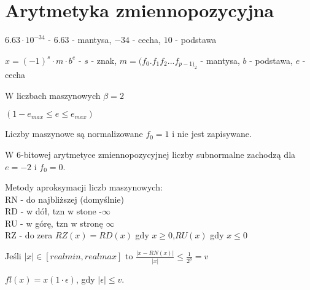 \section{Arytmetyka zmiennopozycyjna}

\entry
$6.63 \cdot 10^{-34}$ - $6.63$ - mantysa, $-34$ - cecha, $10$ - podstawa

\entry
$x = (-1)^s \cdot m \cdot b^e$ - $s$ - znak, $m = (f_0.f_1f_2...f_{p-1)_2}$ - mantysa, $b$ - podstawa, $e$ - cecha

\entry
W liczbach maszynowych $\beta = 2$

\entry
$(1 - e_{max} \leq e \leq e_{max})$

\entry
Liczby maszynowe są normalizowane $f_0 = 1$ i nie jest zapisywane.

\entry
W 6-bitowej arytmetyce zmiennopozycyjnej liczby subnormalne zachodzą dla $e=-2$ i $f_0 = 0$.

\entry
Metody aproksymacji liczb maszynowych:\\
RN - do najbliższej (domyślnie)\\
RD - w dół, tzn w stone -$\infty$\\
RU - w górę, tzn w stronę $\infty$\\
RZ - do zera $RZ(x) = RD(x)$ gdy $x \geq 0$,$RU(x)$ gdy $x \leq 0$

\entry
Jeśli $|x| \in [realmin, realmax]$ to $\frac{|x - RN(x)|}{|x|} \leq \frac{1}{2^p} =v$

\entry 
$fl(x) = x (1 \cdot \epsilon)$, gdy $|\epsilon| \leq v$.